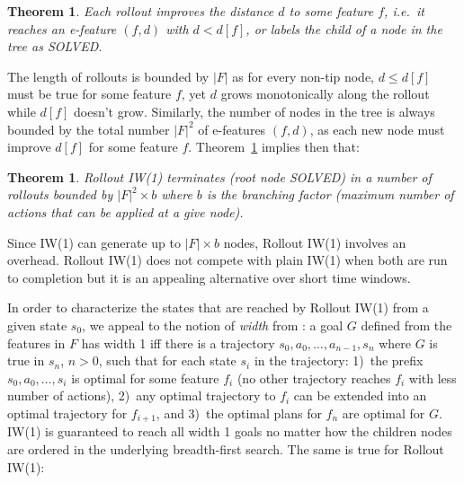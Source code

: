 \documentclass[letterpaper]{article}
\newtheorem{theorem}[definition]{Theorem}
\begin{document}
\begin{theorem}
\label{thm:1}
Each rollout improves the distance $d$ to some feature $f$, i.e.\ it reaches an e-feature $(f,d)$
with $d < d[f]$, or labels the child of a node in the tree as SOLVED.
\end{theorem}


The length of rollouts is bounded by $|F|$ as for every non-tip node,
$d \leq d[f]$ must be true for some feature $f$, yet $d$ grows monotonically
along the rollout while $d[f]$ doesn't  grow. Similarly, the number of nodes in the tree is always  bounded by the total number
$|F|^2$ of e-features $(f,d)$,  as each new node must improve $d[f]$ for some feature $f$.
Theorem~\ref{thm:1} implies then that:%

\begin{theorem}
Rollout IW(1) terminates (root node SOLVED) in a number of rollouts bounded by
$|F|^2 \times b$ where $b$ is the branching factor (maximum number of
actions that can be applied at a give node).
\end{theorem}

Since IW(1) can generate up to $|F| \times b$ nodes, Rollout IW(1) involves an  overhead.
Rollout IW(1) does not compete with plain IW(1) when both are run to completion but
it is an appealing alternative over short time windows.

In order to characterize the states that are reached by Rollout IW(1) from a given state $s_0$,
we appeal to the notion of \emph{width} from \cite{nir:ecai2012}:
a goal $G$ defined from the features in $F$ has width 1 iff
there is a trajectory $s_0,a_0,\ldots,a_{n-1},s_n$ where $G$ is true in $s_n$,   $n > 0$,
such that for each state $s_i$ in the trajectory:
1)~the prefix $s_0,a_0,\ldots,s_i$ is optimal   for some feature $f_i$ (no other trajectory reaches $f_i$ with less number of actions),
2)~any  optimal trajectory to $f_i$ can be extended into an optimal trajectory for  $f_{i+1}$,
and 3)~the optimal plans for $f_n$ are optimal for $G$. IW(1) is guaranteed to reach all width 1 goals no matter how the children nodes are ordered
in the underlying breadth-first search. The same is true for Rollout IW(1):
\end{document}
